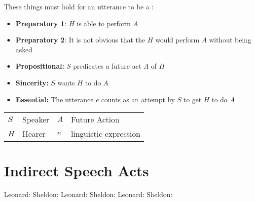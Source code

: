 \documentclass[headrule,footrule]{foils}
\begin{document}

These things must hold for an utterance to be a :
\begin{itemize}
\item \textbf{Preparatory 1}: $H$ is able to perform  $A$
\item \textbf{Preparatory 2}: It is not obvious that the $H$ would perform $A$  without being asked
\item \textbf{Propositional:} $S$ predicates a future act $A$ of $H$
\item \textbf{Sincerity:}  $S$ wants $H$ to do $A$ 
\item \textbf{Essential:} The utterance $e$ counts as an attempt by $S$ to get $H$ to do $A$
\end{itemize}

  \begin{tabular}{llll}
    $S$ & Speaker & $A$ & Future Action \\
    $H$ & Hearer   & $e$ & linguistic expression  \\
  \end{tabular}


\section{Indirect Speech Acts}



\begin{exe}
  \ex Leonard: 
  \ex Sheldon: 
  \ex Leonard: 
  \ex Sheldon: 
  \ex Leonard: 
  \ex Sheldon: 
\end{exe}
\end{document}
